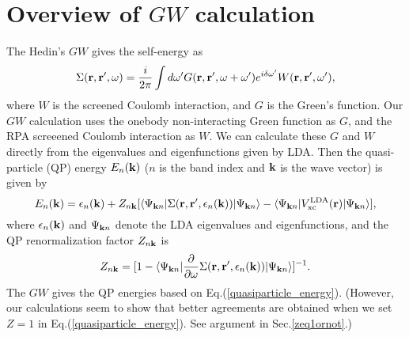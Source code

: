 \documentclass[a4paper,10pt,epsf,fleqn]{article}
\begin{document}
\section{Overview of $GW$ calculation}
The Hedin's $GW$ gives the self-energy as
\begin{equation} 
\label{self_energy}
\Sigma({\bf r},{\bf r}^{\prime},\omega)=\frac{i}{2\pi}\int d\omega'
G({\bf r},{\bf r}^{\prime},\omega+\omega^{\prime})e^{i\delta\omega^{\prime}}
W({\bf r},{\bf r}^{\prime},\omega^{\prime}),
\end{equation}
where $W$ is the screened Coulomb interaction, and $G$ is the Green's
function. Our $GW$ calculation uses the onebody non-interacting Green function as $G$,
and the RPA screeened Coulomb interaction as $W$.
We can calculate these $G$ and $W$ directly from
the eigenvalues and eigenfunctions given by LDA.
Then the quasi-particle (QP) energy $E_n({\bf k})$ 
($n$ is the band index and ${\bf k}$ is the wave vector) is given by
\begin{equation}\label{quasiparticle_energy}
E_n({\bf k})=\epsilon_n({\bf k})+Z_{n{\bf k}}[\langle\Psi_{{\bf k}n}|
\Sigma({\bf r},{\bf r}^{\prime},\epsilon_n({\bf k}))|\Psi_{{\bf k}n}\rangle
- \langle\Psi_{{\bf k}n}|V_{\rm xc}^{\rm LDA}({\bf r})|\Psi_{{\bf k}n}\rangle],
\end{equation}
where $\epsilon_n({\bf k})$ and $\Psi_{{\bf k}n}$ denote the LDA
eigenvalues and eigenfunctions,
and the QP renormalization factor
$Z_{n{\bf k}}$ is
\begin{equation}\label{Renormalization}
Z_{n{\bf k}}=[1-\langle\Psi_{{\bf k}n}|
\frac{\partial}{\partial\omega} \Sigma({\bf r},{\bf r}^{\prime},
\epsilon_n({\bf k}))|\Psi_{{\bf k}n}\rangle]^{-1}.
\end{equation}
The $GW$ gives the QP energies based on Eq.(\ref{quasiparticle_energy}).
(However, our calculations seem to show that better agreements are obtained
when we set $Z=1$ in Eq.(\ref{quasiparticle_energy}). See argument in Sec.\ref{zeq1ornot}.)
\end{document}

